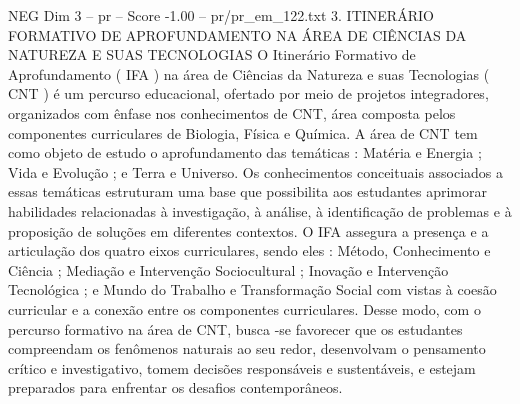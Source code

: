 \begin{textsample}{NEG Dim 3 – pr – Score -1.00 – pr/pr\_em\_122.txt}  \label{ex:f3_neg_134}
3.
ITINERÁRIO FORMATIVO DE APROFUNDAMENTO NA ÁREA DE CIÊNCIAS DA NATUREZA E SUAS TECNOLOGIAS O Itinerário Formativo de Aprofundamento ( IFA ) na área de Ciências da Natureza e suas Tecnologias ( CNT ) é um percurso educacional, ofertado por meio de projetos integradores, organizados com ênfase nos conhecimentos de CNT, área composta pelos componentes curriculares de Biologia, Física e Química.
A área de CNT tem como objeto de estudo o aprofundamento das temáticas : Matéria e Energia ; Vida e Evolução ; e Terra e Universo.
Os conhecimentos conceituais associados a essas temáticas estruturam uma base que possibilita aos estudantes aprimorar habilidades relacionadas à investigação, à análise, à identificação de problemas e à proposição de soluções em diferentes contextos.
O IFA assegura a presença e a articulação dos quatro eixos curriculares, sendo eles : Método, Conhecimento e Ciência ; Mediação e Intervenção Sociocultural ; Inovação e Intervenção Tecnológica ; e Mundo do Trabalho e Transformação Social com vistas à coesão curricular e a conexão entre os componentes curriculares.
Desse modo, com o percurso formativo na área de CNT, busca -se favorecer que os estudantes compreendam os fenômenos naturais ao seu redor, desenvolvam o pensamento crítico e investigativo, tomem decisões responsáveis e sustentáveis, e estejam preparados para enfrentar os desafios contemporâneos.

\end{textsample}
